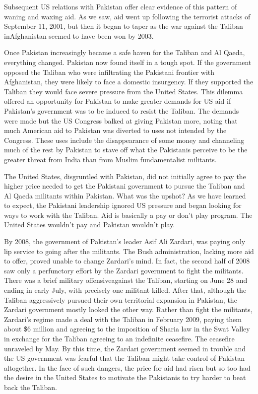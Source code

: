 \documentclass[10pt]{article}
\begin{document}
{\large Subsequent US relations with Pakistan offer clear evidence of this
pattern of waning and waxing aid. As we saw, aid went up following the terrorist
attacks of September 11, 2001, but then it began to taper as the war against the
Taliban inAfghanistan seemed to have been won by 2003.}

{\large Once Pakistan increasingly became a safe haven for the Taliban and Al
Qaeda, everything changed. Pakistan now found itself in a tough spot. If the
government opposed the Taliban who were infiltrating the Pakistani frontier with
Afghanistan, they were likely to face a domestic insurgency. If they supported
the Taliban they would face severe pressure from the United States. This dilemma
offered an opportunity for Pakistan to make greater demands for US aid if
Pakistan's government was to be induced to resist the Taliban. The demands were
made but the US Congress balked at giving Pakistan more, noting that much
American aid to Pakistan was diverted to uses not intended by the Congress. These
uses include the disappearance of some money and channeling much of the rest by
Pakistan to stave off what the Pakistanis perceive to be the greater threat from
India than from Muslim fundamentalist militants.}

{\large The United States, disgruntled with Pakistan, did not initially agree to
pay the higher price needed to get the Pakistani government to pursue the Taliban
and Al Qaeda militants within Pakistan. What was the upshot? As we have learned
to expect, the Pakistani leadership ignored US pressure and began looking for
ways to work with the Taliban. Aid is basically a pay or don't play program. The
United States wouldn't pay and Pakistan wouldn't play.}

{\large By 2008, the government of Pakistan's leader Asif Ali Zardari, was
paying only lip service to going after the militants. The Bush administration,
lacking more aid to offer, proved unable to change Zardari's mind. In fact, the
second half of 2008 saw only a perfunctory effort by the Zardari government to
fight the militants. There was a brief military offensiveagainst the Taliban,
starting on June 28 and ending in early July, with precisely one militant killed.
After that, although the Taliban aggressively pursued their own territorial
expansion in Pakistan, the Zardari government mostly looked the other way. Rather
than fight the militants, Zardari's regime made a deal with the Taliban in
February 2009, paying them about \$6 million and agreeing to the imposition of
Sharia law in the Swat Valley in exchange for the Taliban agreeing to an
indefinite ceasefire. The ceasefire unraveled by May. By this time, the Zardari
government seemed in trouble and the US government was fearful that the Taliban
might take control of Pakistan altogether. In the face of such dangers, the price
for aid had risen but so too had the desire in the United States to motivate the
Pakistanis to try harder to beat back the Taliban.}
\end{document}
